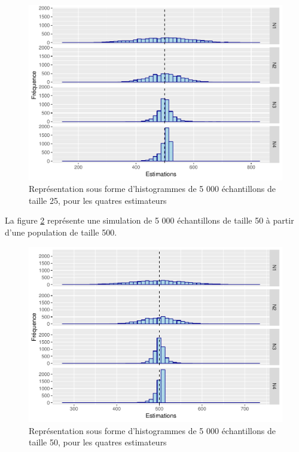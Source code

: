 \documentclass[10pt]{article}
\begin{document}
\begin{figure}

{\centering \includegraphics[width=0.9\linewidth]{serial_number_amq_files/figure-latex/ech-taille-25-1} 

}

\caption{Représentation sous forme d'histogrammes de 5 000 échantillons de taille 25, pour les quatres estimateurs}\label{fig:ech-taille-25}
\end{figure}

La figure \ref{fig:ech-taille-50} représente une simulation de 5 000
échantillons de taille 50 à partir d'une population de taille 500.

\begin{figure}

{\centering \includegraphics[width=0.9\linewidth]{serial_number_amq_files/figure-latex/ech-taille-50-1} 

}

\caption{Représentation sous forme d'histogrammes de 5 000 échantillons de taille 50, pour les quatres estimateurs}\label{fig:ech-taille-50}
\end{figure}
\end{document}
